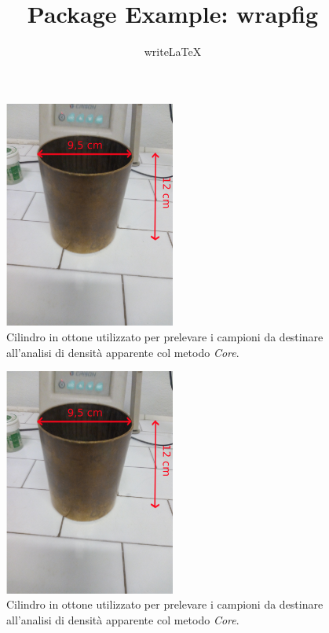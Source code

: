 \documentclass[a4paper]{article}
\title{Package Example: wrapfig}
\author{writeLaTeX}
\begin{document}
\maketitle

\begin{figure}
  \includegraphics[width=0.5\textwidth]{../foto/cilindroOttone.jpeg}

  \caption[Cilindro in ottone usato per la misura della densità
  apparente: metodo \emph{Core}]{Cilindro in ottone utilizzato per
    prelevare i campioni da destinare all'analisi di densità
    apparente col metodo \emph{Core}.}
  \label{fig:cilindro}
\end{figure}

\lipsum[1]

\begin{figure}
  \includegraphics[width=0.5\textwidth]{../foto/cilindroOttone.jpeg}

  \caption[Cilindro in ottone usato per la misura della densità
  apparente: metodo \emph{Core}]{Cilindro in ottone utilizzato per
    prelevare i campioni da destinare all'analisi di densità
    apparente col metodo \emph{Core}.}
  \label{fig:cilindro}
\end{figure}

\lipsum[2-3]
\end{document}
